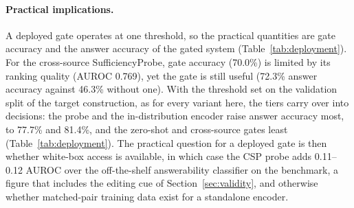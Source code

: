 \documentclass[acmsmall,screen,review]{acmart}
\newcommand{\sprobe}{SufficiencyProbe}
\begin{document}
\paragraph{Practical implications.}
A deployed gate operates at one threshold, so the practical quantities are gate accuracy and the answer accuracy of the gated system (Table~\ref{tab:deployment}). For the cross-source \sprobe{}, gate accuracy (70.0\%) is limited by its ranking quality (AUROC 0.769), yet the gate is still useful (72.3\% answer accuracy against 46.3\% without one). With the threshold set on the validation split of the target construction, as for every variant here, the tiers carry over into decisions: the probe and the in-distribution encoder raise answer accuracy most, to 77.7\% and 81.4\%, and the zero-shot and cross-source gates least (Table~\ref{tab:deployment}). The practical question for a deployed gate is then whether white-box access is available, in which case the CSP probe adds 0.11--0.12 AUROC over the off-the-shelf answerability classifier on the benchmark, a figure that includes the editing cue of Section~\ref{sec:validity}, and otherwise whether matched-pair training data exist for a standalone encoder.
\end{document}
